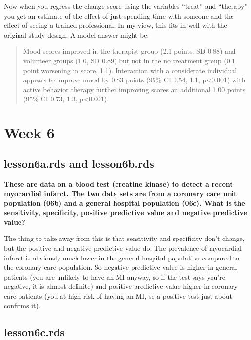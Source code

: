 \documentclass[]{book}
\begin{document}
Now when you regress the change score using the variables ``treat'' and ``therapy'' you get an estimate of the effect of just spending time with someone and the effect of seeing a trained professional. In my view, this fits in well with the original study design. A model answer might be:

\begin{quote}
Mood scores improved in the therapist group (2.1 points, SD 0.88) and volunteer groups (1.0, SD 0.89) but not in the no treatment group (0.1 point worsening in score, 1.1). Interaction with a considerate individual appears to improve mood by 0.83 points (95\% CI 0.54, 1.1, p\textless0.001) with active behavior therapy further improving scores an additional 1.00 points (95\% CI 0.73, 1.3, p\textless0.001).
\end{quote}

\hypertarget{week-6-1}{%
\section{Week 6}\label{week-6-1}}

\hypertarget{lesson6a.rds-and-lesson6b.rds}{%
\subsection{lesson6a.rds and lesson6b.rds}\label{lesson6a.rds-and-lesson6b.rds}}

\textbf{These are data on a blood test (creatine kinase) to detect a recent myocardial infarct. The two data sets are from a coronary care unit population (06b) and a general hospital population (06c). What is the sensitivity, specificity, positive predictive value and negative predictive value?}

The thing to take away from this is that sensitivity and specificity don't change, but the positive and negative predictive value do. The prevalence of myocardial infarct is obviously much lower in the general hospital population compared to the coronary care population. So negative predictive value is higher in general patients (you are unlikely to have an MI anyway, so if the test says you're negative, it is almost definite) and positive predictive value higher in coronary care patients (you at high risk of having an MI, so a positive test just about confirms it).

\hypertarget{lesson6c.rds}{%
\subsection{lesson6c.rds}\label{lesson6c.rds}}
\end{document}
